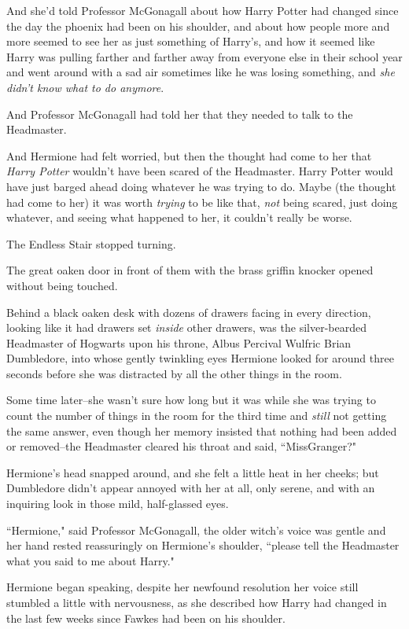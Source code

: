 And she'd told Professor McGonagall about how Harry Potter had changed since the day the phoenix had been on his shoulder, and about how people more and more seemed to see her as just something of Harry's, and how it seemed like Harry was pulling farther and farther away from everyone else in their school year and went around with a sad air sometimes like he was losing something, and \emph{she didn't know what to do anymore}.

And Professor McGonagall had told her that they needed to talk to the Headmaster.

And Hermione had felt worried, but then the thought had come to her that \emph{Harry Potter} wouldn't have been scared of the Headmaster. Harry Potter would have just barged ahead doing whatever he was trying to do. Maybe (the thought had come to her) it was worth \emph{trying} to be like that, \emph{not} being scared, just doing whatever, and seeing what happened to her, it couldn't really be worse.

The Endless Stair stopped turning.

The great oaken door in front of them with the brass griffin knocker opened without being touched.

Behind a black oaken desk with dozens of drawers facing in every direction, looking like it had drawers set \emph{inside} other drawers, was the silver-bearded Headmaster of Hogwarts upon his throne, Albus Percival Wulfric Brian Dumbledore, into whose gently twinkling eyes Hermione looked for around three seconds before she was distracted by all the other things in the room.

Some time later\---she wasn't sure how long but it was while she was trying to count the number of things in the room for the third time and \emph{still} not getting the same answer, even though her memory insisted that nothing had been added or removed\---the Headmaster cleared his throat and said, ``Miss\?Granger?"

Hermione's head snapped around, and she felt a little heat in her cheeks; but Dumbledore didn't appear annoyed with her at all, only serene, and with an inquiring look in those mild, half-glassed eyes.

``Hermione," said Professor McGonagall, the older witch's voice was gentle and her hand rested reassuringly on Hermione's shoulder, ``please tell the Headmaster what you said to me about Harry."

Hermione began speaking, despite her newfound resolution her voice still stumbled a little with nervousness, as she described how Harry had changed in the last few weeks since Fawkes had been on his shoulder.

